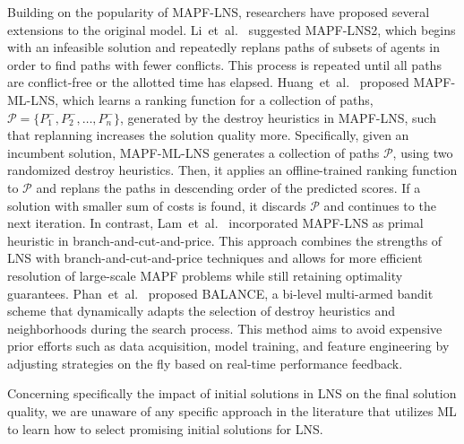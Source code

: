 \documentclass[runningheads]{llncs}
\begin{document}
Building on the popularity of MAPF-LNS, researchers have proposed several extensions to the original model. Li~et~al.~\cite{li-2022} suggested MAPF-LNS2, which begins with an infeasible solution and repeatedly replans paths of subsets of agents in order to find paths with fewer conflicts. This process is repeated until all paths are conflict-free or the allotted time has elapsed. Huang~et~al.~\cite{huang-2022} proposed MAPF-ML-LNS, which learns a ranking function for a collection of paths, $\mathcal{P} = \{P^-_1, P^-_2, \ldots, P^-_n\}$, generated by the destroy heuristics in MAPF-LNS, such that replanning increases the solution quality more. Specifically, given an incumbent solution, MAPF-ML-LNS generates a collection of paths $\mathcal{P}$, using two randomized destroy heuristics. Then, it applies an offline-trained ranking function to $\mathcal{P}$ and replans the paths in descending order of the predicted scores. If a solution with smaller sum of costs is found, it discards $\mathcal{P}$ and continues to the next iteration. In contrast, Lam~et~al.~\cite{lam-2023} incorporated MAPF-LNS as primal heuristic in branch-and-cut-and-price. This approach combines the strengths of LNS with branch-and-cut-and-price techniques and allows for more efficient resolution of large-scale MAPF problems while still retaining optimality guarantees. Phan~et~al.~\cite{phan-2024} proposed BALANCE, a bi-level multi-armed bandit scheme that dynamically adapts the selection of destroy heuristics and neighborhoods during the search process. This method aims to avoid expensive prior efforts such as data acquisition, model training, and feature engineering by adjusting strategies on the fly based on real-time performance feedback.

Concerning specifically the impact of initial solutions in LNS on the final solution quality, we are unaware of any specific approach in the literature that utilizes ML to learn how to select promising initial solutions for LNS.
\end{document}
